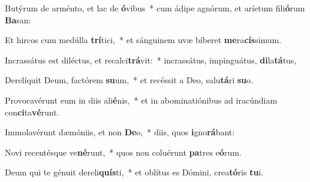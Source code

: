 \item Butýrum de arménto, et lac de \textbf{ó}vibus~* cum ádipe agnórum, et aríetum fili\textbf{ó}rum \textbf{Ba}san:
\item Et hircos cum medúlla \textbf{trí}tici,~* et sánguinem uvæ bíberet \textbf{me}ra\textbf{cís}simum.
\item Incrassátus est diléctus, et recalci\textbf{trá}vit:~* incrassátus, impinguátus, \textbf{di}la\textbf{tá}tus,
\item Derelíquit Deum, factórem \textbf{su}um,~* et recéssit a Deo, salu\textbf{tá}ri \textbf{su}o.
\item Provocavérunt eum in diis ali\textbf{é}nis,~* et in abominatiónibus ad iracúndiam con\textbf{ci}ta\textbf{vé}runt.
\item Immolavérunt dæmóniis, et non \textbf{De}o,~* diis, quos \textbf{i}gno\textbf{rá}bant:
\item Novi recentésque ve\textbf{né}runt,~* quos non coluérunt \textbf{pa}tres e\textbf{ó}rum.
\item Deum qui te génuit dereli\textbf{quís}ti,~* et oblítus es Dómini, crea\textbf{tó}ris \textbf{tu}i.
